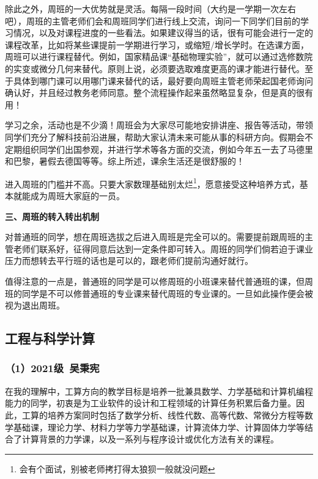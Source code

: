 \documentclass[11pt,oneside]{book}
\begin{document}
\vspace{10pt}

除此之外，周班的一大优势就是灵活。每隔一段时间（大约是一学期一次左右吧），周班的主管老师们会和周班同学们进行线上交流，询问一下同学们目前的学习情况，以及对课程进度的一些看法。如果建议得当的话，很有可能会进行一定的课程改革，比如将某些课提前一学期进行学习，或缩短/增长学时。在选课方面，周班可以进行课程替代。例如，国家精品课“基础物理实验”，就可以通过选修数院的实变或微分几何来替代。原则上说，必须要选取难度更高的课才能进行替代。至于具体到哪门课可以用哪门课来替代的话，最好要向周班主管老师荣起国老师询问确认好，并且经过教务老师同意。整个流程操作起来虽然略显复杂，但是真的很有用！

\vspace{10pt}

学习之余，活动也是不少滴！周班会为大家尽可能地安排讲座、报告等活动，带领同学们充分了解科技前沿进展，帮助大家认清未来可能从事的科研方向。假期会不定期组织同学们出国参观，并进行学术等各方面的交流，例如今年五一去了马德里和巴黎，暑假去德国等等。综上所述，课余生活还是很舒服的！

\vspace{10pt}

进入周班的门槛并不高。只要大家数理基础别太烂\footnote{会有个面试，别被老师拷打得太狼狈一般就没问题}，愿意接受这种培养方式，基本就能成为周班大家庭的一员。

\vspace{10pt}

\textbf{\textbf{三、周班的转入转出机制}}

对普通班的同学，想在周班选拔之后进入周班是完全可以的。需要提前跟周班的主管老师们联系好，征得同意后达到一定条件即可转入。周班的同学们倘若迫于课业压力而想转去平行班的话也是可以的，跟老师们提前沟通好就行。

\vspace{10pt}

值得注意的一点是，普通班的同学是可以修周班的小班课来替代普通班的课，但周班的同学是不可以修普通班的专业课来替代周班的专业课的。一旦如此操作便会被视为退出周班。

\subsection{工程与科学计算}
\subsubsection{（1）2021级\ 吴秉宪}

在我的理解中，工算方向的教学目标是培养一批兼具数学、力学基础和计算机编程能力的同学，初衷是为工业软件的设计和工程领域的计算任务积累后备力量。因此，工算的培养方案同时包括了数学分析、线性代数、高等代数、常微分方程等数学基础课，理论力学、材料力学等力学基础课，计算流体力学、计算固体力学等结合了计算背景的力学课，以及一系列与程序设计或优化方法有关的课程。
\end{document}
